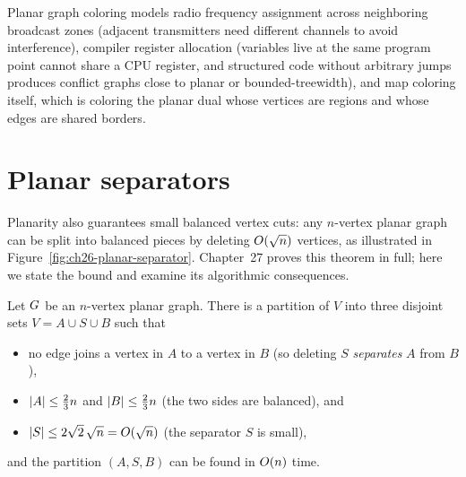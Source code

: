 \begin{applicationbox}
Planar graph coloring models radio frequency assignment across neighboring broadcast zones
(adjacent transmitters need different channels to avoid interference), compiler register
allocation (variables live at the same program point cannot share a CPU register, and
structured code without arbitrary jumps produces conflict graphs close to planar or
bounded-treewidth), and map coloring itself, which is coloring the planar dual whose
vertices are regions and whose edges are shared borders.
\end{applicationbox}

\section{Planar separators}
\label{ch26:separators}

Planarity also guarantees small balanced vertex cuts: any $n$-vertex planar graph can be
split into balanced pieces by deleting $O(\sqrt n)$ vertices, as illustrated in
Figure~\ref{fig:ch26-planar-separator}. Chapter~27 proves this theorem in full; here we
state the bound and examine its algorithmic consequences.

\begin{theorem}
\label{ch26:thm-separator}
Let $G$ be an $n$-vertex planar graph. There is a partition of $V$ into three disjoint
sets $V = A \cup S \cup B$ such that
\begin{itemize}
  \item no edge joins a vertex in $A$ to a vertex in $B$ (so deleting $S$ \emph{separates} $A$ from $B$),
  \item $\lvert A\rvert \le \frac{2}{3}n$ and $\lvert B\rvert \le \frac{2}{3}n$ (the two sides are balanced), and
  \item $\lvert S\rvert \le 2\sqrt{2}\,\sqrt n = O(\sqrt n)$ (the separator $S$ is small),
\end{itemize}
and the partition $(A,S,B)$ can be found in $O(n)$ time.
\end{theorem}

